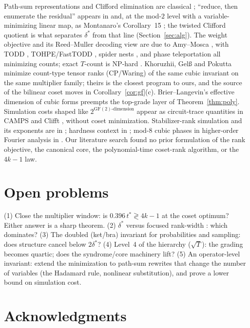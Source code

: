 \documentclass[11pt]{article}
\theoremstyle{definition}
\theoremstyle{remark}
\newcommand{\ds}{\delta^{*}}
\newcommand{\ts}{t^{*}}
\begin{document}
Path-sum representations and Clifford elimination are classical \cite{DHH05,dBDKR08,Amy19};
``reduce, then enumerate the residual'' appears in \cite{Amy19} and, at the mod-$2$ level with a
variable-minimizing linear map, as Montanaro's Corollary~15 \cite{Mon17}; the twisted Clifford quotient
is what separates $\ds$ from that line (Section~\ref{sec:alg}). The weight objective and its Reed--Muller
decoding view are due to Amy--Mosca \cite{AM19}, with TODD \cite{HC19}, TOHPE/FastTODD
\cite{Van24}, spider nests \cite{dBBW20}, and phase teleportation \cite{KvdW20} all minimizing counts;
exact $T$-count is NP-hard \cite{vdWA23}. Khoruzhii, Gel{\ss} and Pokutta \cite{KGP26b} minimize count-type
tensor ranks (CP/Waring) of the same cubic invariant on the same multiplier family; theirs
is the closest program to ours, and the source of the bilinear coset moves in Corollary~\ref{cor:gf}(c).
Brier--Langevin's effective dimension of cubic forms \cite{BL03,KGP26a} preempts the top-grade
layer of Theorem~\ref{thm:poly}. Simulation costs shaped like $2^{\mathrm{GF}(2)\text{-dimension}}$ appear as circuit-trace
quantities in CAMPS \cite{LC26} and Clifft \cite{CL26a}, without coset minimization. Stabilizer-rank simulation and its exponents are in
\cite{BG16,BBC19,QPG21,KvdW22,KvdWV22}; hardness context in \cite{vdWA23,HNS20,JVdN14,Mon17}; mod-$8$ cubic phases in
higher-order Fourier analysis in \cite{Lab22}. Our literature search found no prior formulation of the rank objective, the canonical
core, the polynomial-time coset-rank algorithm, or the $4k-1$ law.

\section{Open problems}

(1) Close the multiplier window: is $0.396\,\ts\gtrless4k-1$ at the coset optimum? Either answer is a sharp theorem.
(2) $\ds$ versus focused rank-width \cite{CL26b}: which dominates? (3) The doubled (ket/bra) invariant for probabilities
and sampling: does structure cancel below $2\ds$? (4) Level~4 of the hierarchy ($\sqrt T$): the grading
becomes quartic; does the syndrome/core machinery lift? (5) An operator-level invariant: extend the minimization to
path-sum rewrites that change the number of variables (the Hadamard rule, nonlinear substitution), and prove a
lower bound on simulation cost.

\section*{Acknowledgments}
\end{document}
